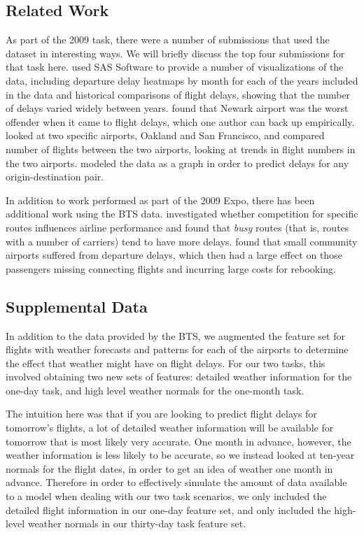 \documentclass{article}
\begin{document}
\subsection{Related Work}

As part of the 2009 task, there were a number of submissions that used the dataset in interesting ways. We will briefly discuss the top four submissions for that task here.
\cite{wicklin2009congestion} used SAS Software to provide a number of visualizations of the data, including departure delay heatmaps by month for each of the years included in the data and historical comparisons of flight delays, showing that the number of delays varied widely between years.
\cite{hofmann2011delayed} found that Newark airport was the worst offender when it came to flight delays, which one author can back up empirically.
\cite{wickham2011tale} looked at two specific airports, Oakland and San Francisco, and compared number of flights between the two airports, looking at trends in flight numbers in the two airports.
\cite{dey2009minimizing} modeled the data as a graph in order to predict delays for any origin-destination pair.

In addition to work performed as part of the 2009 Expo, there has been additional work using the BTS data.
\cite{rupp2006does} investigated whether competition for specific routes influences airline performance and found that \emph{busy} routes (that is, routes with a number of carriers) tend to have more delays.
\cite{stone2015investigating} found that small community airports suffered from departure delays, which then had a large effect on those passengers missing connecting flights and incurring large costs for rebooking.


\subsection{Supplemental Data}

In addition to the data provided by the BTS, we augmented the feature set for flights with weather forecasts and patterns for each of the airports to determine the effect that weather might have on flight delays.
For our two tasks, this involved obtaining two new sets of features: detailed weather information for the one-day task, and high level weather normals for the one-month task.

The intuition here was that if you are looking to predict flight delays for tomorrow's flights, a lot of detailed weather information will be available for tomorrow that is most likely very accurate.
One month in advance, however, the weather information is less likely to be accurate, so we instead looked at ten-year normals for the flight dates, in order to get an idea of weather one month in advance.
Therefore in order to effectively simulate the amount of data available to a model when dealing with our two task scenarios, we only included the detailed flight information in our one-day feature set, and only included the high-level weather normals in our thirty-day task feature set.
\end{document}

